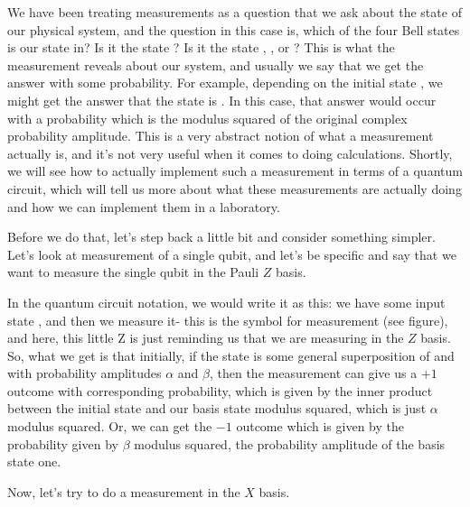 We have been treating measurements as a question that we ask about the state of our physical system, and the question in this case is, which of the four Bell states is our state in? Is it the state \ket{\Phi^+}? Is it the state \ket{\Phi^-}, \ket{\Psi^+}, or \ket{\Psi^-}? This is what the measurement reveals about our system, and usually we say that we get the answer with some probability. For example, depending on the initial state \ket{\psi}, we might get the answer that the state is \ket{\Phi^+}. In this case, that answer would occur with a probability which is the modulus squared of the original complex probability amplitude. This is a very abstract notion of what a measurement actually is, and it's not very useful when it comes to doing calculations. Shortly, we will see how to actually implement such a measurement in terms of a quantum circuit, which will tell us more about what these measurements are actually doing and how we can implement them in a laboratory.

Before we do that, let's step back a little bit and consider something simpler. Let's look at measurement of a single qubit, and let's be specific and say that we want to measure the single qubit in the Pauli $Z$ basis.


In the quantum circuit notation, we would write it as this: we have some input state \ket{\psi}, and then we measure it- this is the symbol for measurement (see figure), and here, this little Z is just reminding us that we are measuring in the $Z$ basis.  So, what we get is that initially, if the state is some general superposition of  and  with probability amplitudes $\alpha$ and $\beta$, then the measurement can give us a $+1$ outcome with corresponding probability, which is given by the inner product between the initial state and our basis state  modulus squared, which is just $\alpha$ modulus squared. Or, we can get the  $-1$ outcome which is given by the probability given by $\beta$ modulus squared, the probability amplitude of the basis state one.

Now, let's try to do a measurement in the $X$ basis.

